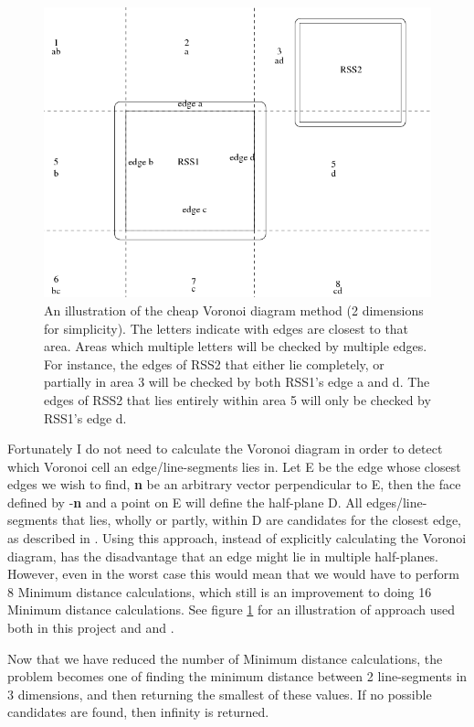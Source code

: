\begin{figure}
\centering
\includegraphics[width=\textwidth]{figures/vorCheap}
\caption{\label{vor-cheap}An illustration of the cheap Voronoi diagram method (2 dimensions for simplicity). The letters indicate with edges are closest to that area. Areas which multiple letters will be checked by multiple edges. For instance, the edges of RSS2 that either lie completely, or partially in area 3 will be checked by both RSS1's edge a and d. The edges of RSS2 that lies entirely within area 5 will only be checked by RSS1's edge d.}
\end{figure}

Fortunately I do not need to calculate the Voronoi diagram in order to detect which Voronoi cell an edge/line-segments lies in. Let E be the edge whose closest edges we wish to find, \textbf{n} be an arbitrary vector perpendicular to E, then the face defined by -\textbf{n} and a point on E will define the half-plane D. All edges/line-segments that lies, wholly or partly, within D are candidates for the closest edge, as described in \cite{larsen00fast}. Using this approach, instead of explicitly calculating the Voronoi diagram, has the disadvantage that an edge might lie in multiple half-planes. However, even in the worst case this would mean that we would have to perform 8 Minimum distance calculations, which still is an improvement to doing 16 Minimum distance calculations. See figure \ref{vor-cheap} for an illustration of approach used both in this project and \cite{larsen00fast} and \cite{Larsen99fastproximity}.

Now that we have reduced the number of Minimum distance calculations, the problem becomes one of finding the minimum distance between 2 line-segments in 3 dimensions, and then returning the smallest of these values. If no possible candidates are found, then infinity is returned.

